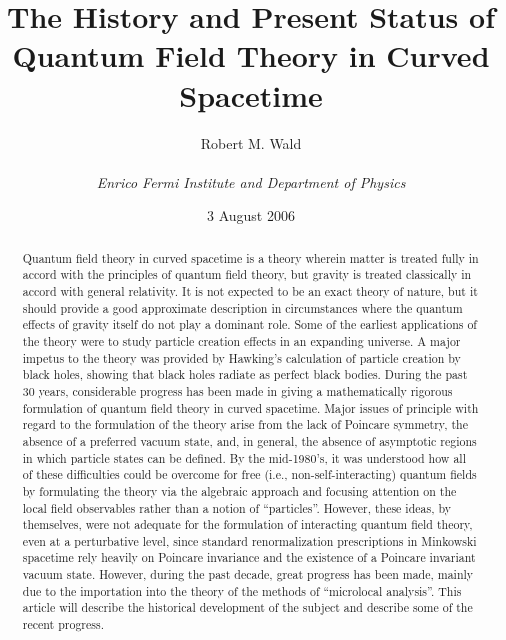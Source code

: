 \documentclass[12pt,epsf,amsfonts,amssymb]{article}
\begin{document}
 

\title{ The History and Present Status of Quantum Field Theory in Curved
Spacetime}  

\author{Robert M. Wald \\ \\  
 {\it Enrico Fermi Institute and Department of Physics}%
        } %

\date{3 August 2006}

\maketitle

\begin{abstract}

Quantum field theory in curved spacetime is a theory wherein matter is
treated fully in accord with the principles of quantum field theory,
but gravity is treated classically in accord with general
relativity. It is not expected to be an exact theory of nature, but it
should provide a good approximate description in circumstances where
the quantum effects of gravity itself do not play a dominant role.
Some of the earliest applications of the theory were to
study particle creation effects in an expanding universe. A major
impetus to the theory was provided by Hawking's calculation of
particle creation by black holes, showing that black holes radiate as
perfect black bodies. During the past 30 years, considerable progress
has been made in giving a mathematically rigorous formulation of
quantum field theory in curved spacetime. Major issues of principle
with regard to the formulation of the theory arise from the lack of
Poincare symmetry, the absence of a preferred vacuum state, and, in
general, the absence of asymptotic regions in which particle states
can be defined. By the mid-1980's, it was understood how all of these
difficulties could be overcome for free (i.e., non-self-interacting)
quantum fields by formulating the theory via the algebraic approach
and focusing attention on the local field observables rather than a notion
of ``particles''. However, these
ideas, by themselves, were not adequate for the formulation of
interacting quantum field theory, even at a perturbative level, since
standard renormalization prescriptions in Minkowski spacetime rely
heavily on Poincare invariance and the existence of a Poincare
invariant vacuum state. However, during the past decade, great
progress has been made, mainly due to the importation into the theory
of the methods of ``microlocal analysis''. This article will describe
the historical development of the subject and describe some of the
recent progress.

\end{abstract} 
\end{document}
